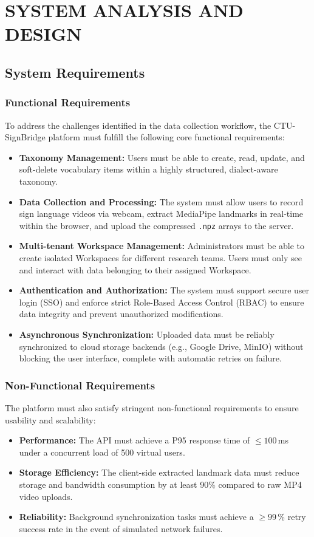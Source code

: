 \chapter{SYSTEM ANALYSIS AND DESIGN}

\section{System Requirements}

\subsection{Functional Requirements}
To address the challenges identified in the data collection workflow, the CTU-SignBridge platform must fulfill the following core functional requirements:
\begin{itemize}
    \item \textbf{Taxonomy Management:} Users must be able to create, read, update, and soft-delete vocabulary items within a highly structured, dialect-aware taxonomy.
    \item \textbf{Data Collection and Processing:} The system must allow users to record sign language videos via webcam, extract MediaPipe landmarks in real-time within the browser, and upload the compressed \texttt{.npz} arrays to the server.
    \item \textbf{Multi-tenant Workspace Management:} Administrators must be able to create isolated Workspaces for different research teams. Users must only see and interact with data belonging to their assigned Workspace.
    \item \textbf{Authentication and Authorization:} The system must support secure user login (SSO) and enforce strict Role-Based Access Control (RBAC) to ensure data integrity and prevent unauthorized modifications.
    \item \textbf{Asynchronous Synchronization:} Uploaded data must be reliably synchronized to cloud storage backends (e.g., Google Drive, MinIO) without blocking the user interface, complete with automatic retries on failure.
\end{itemize}

\subsection{Non-Functional Requirements}
The platform must also satisfy stringent non-functional requirements to ensure usability and scalability:
\begin{itemize}
    \item \textbf{Performance:} The API must achieve a P95 response time of $\leq 100$\,ms under a concurrent load of 500 virtual users.
    \item \textbf{Storage Efficiency:} The client-side extracted landmark data must reduce storage and bandwidth consumption by at least 90\% compared to raw MP4 video uploads.
    \item \textbf{Reliability:} Background synchronization tasks must achieve a $\geq 99$\,\% retry success rate in the event of simulated network failures.
\end{itemize}

